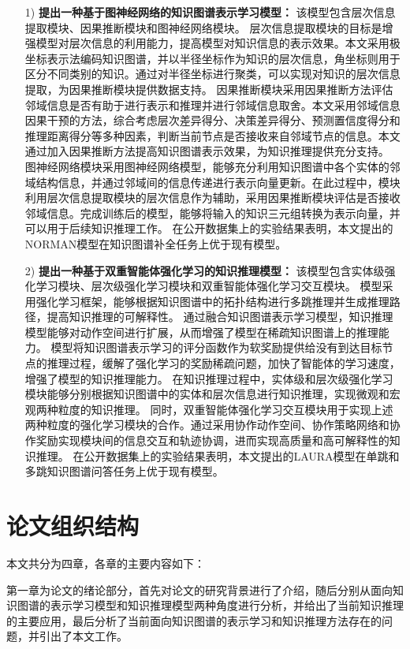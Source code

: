 \documentclass[algorithmlist, AutoFakeBold, AutoFakeSlant, figurelist, tablelist, nomlist, engineering]{seuthesix}
\begin{document}
\begin{itemize}
  \item [1)]\textbf{提出一种基于图神经网络的知识图谱表示学习模型：}
  该模型包含层次信息提取模块、因果推断模块和图神经网络模块。
  层次信息提取模块的目标是增强模型对层次信息的利用能力，提高模型对知识信息的表示效果。本文采用极坐标表示法编码知识图谱，并以半径坐标作为知识的层次信息，角坐标则用于区分不同类别的知识。通过对半径坐标进行聚类，可以实现对知识的层次信息提取，为因果推断模块提供数据支持。
  因果推断模块采用因果推断方法评估邻域信息是否有助于进行表示和推理并进行邻域信息取舍。本文采用邻域信息因果干预的方法，综合考虑层次差异得分、决策差异得分、预测置信度得分和推理距离得分等多种因素，判断当前节点是否接收来自邻域节点的信息。本文通过加入因果推断方法提高知识图谱表示效果，为知识推理提供充分支持。
  图神经网络模块采用图神经网络模型，能够充分利用知识图谱中各个实体的邻域结构信息，并通过邻域间的信息传递进行表示向量更新。在此过程中，模块利用层次信息提取模块的层次信息作为辅助，采用因果推断模块评估是否接收邻域信息。完成训练后的模型，能够将输入的知识三元组转换为表示向量，并可以用于后续知识推理工作。
  在公开数据集上的实验结果表明，本文提出的NORMAN模型在知识图谱补全任务上优于现有模型。
  \item [2)]\textbf{提出一种基于双重智能体强化学习的知识推理模型：}
  该模型包含实体级强化学习模块、层次级强化学习模块和双重智能体强化学习交互模块。
  模型采用强化学习框架，能够根据知识图谱中的拓扑结构进行多跳推理并生成推理路径，提高知识推理的可解释性。
  通过融合知识图谱表示学习模型，知识推理模型能够对动作空间进行扩展，从而增强了模型在稀疏知识图谱上的推理能力。
  模型将知识图谱表示学习的评分函数作为软奖励提供给没有到达目标节点的推理过程，缓解了强化学习的奖励稀疏问题，加快了智能体的学习速度，增强了模型的知识推理能力。
  在知识推理过程中，实体级和层次级强化学习模块能够分别根据知识图谱中的实体和层次信息进行知识推理，实现微观和宏观两种粒度的知识推理。
  同时，双重智能体强化学习交互模块用于实现上述两种粒度的强化学习模块的合作。通过采用协作动作空间、协作策略网络和协作奖励实现模块间的信息交互和轨迹协调，进而实现高质量和高可解释性的知识推理。
  在公开数据集上的实验结果表明，本文提出的LAURA模型在单跳和多跳知识图谱问答任务上优于现有模型。
\end{itemize}


\section{论文组织结构}
本文共分为四章，各章的主要内容如下：

第一章为论文的绪论部分，首先对论文的研究背景进行了介绍，随后分别从面向知识图谱的表示学习模型和知识推理模型两种角度进行分析，并给出了当前知识推理的主要应用，最后分析了当前面向知识图谱的表示学习和知识推理方法存在的问题，并引出了本文工作。
\end{document}
